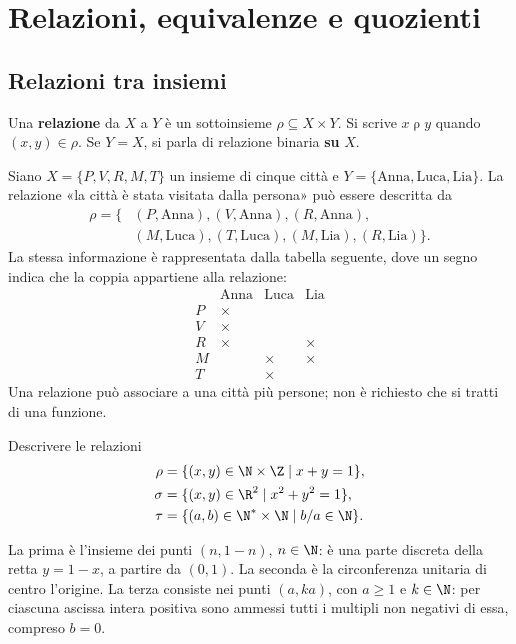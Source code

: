 \chapter{Relazioni, equivalenze e quozienti}

\section{Relazioni tra insiemi}
\begin{definizione}
Una \textbf{relazione} da $X$ a $Y$ è un sottoinsieme $\rho\subseteq X\times Y$. Si scrive $x\mathrel\rho y$ quando $(x,y)\in\rho$. Se $Y=X$, si parla di relazione binaria \textbf{su} $X$.
\end{definizione}

\begin{esempio}
Siano $X=\{P,V,R,M,T\}$ un insieme di cinque città e $Y=\{\text{Anna},\text{Luca},\text{Lia}\}$. La relazione «la città è stata visitata dalla persona» può essere descritta da
\[
\begin{split}
\rho=\{&(P,\text{Anna}),(V,\text{Anna}),(R,\text{Anna}),\\
       &(M,\text{Luca}),(T,\text{Luca}),(M,\text{Lia}),(R,\text{Lia})\}.
\end{split}
\]
La stessa informazione è rappresentata dalla tabella seguente, dove un segno indica che la coppia appartiene alla relazione:
\[
\begin{array}{c|ccc}
&\text{Anna}&\text{Luca}&\text{Lia}\\\hline
P&\times&&\\V&\times&&\\R&\times&&\times\\M&&\times&\times\\T&&\times&
\end{array}
\]
Una relazione può associare a una città più persone; non è richiesto che si tratti di una funzione.
\end{esempio}

\begin{esercizio}
Descrivere le relazioni
\[
\begin{aligned}
\rho&=\{(x,y)\in\N\times\Z\mid x+y=1\},\\
\sigma&=\{(x,y)\in\R^2\mid x^2+y^2=1\},\\
\tau&=\{(a,b)\in\N^*\times\N\mid b/a\in\N\}.
\end{aligned}
\]
\end{esercizio}
\begin{svolgimento}
La prima è l'insieme dei punti $(n,1-n)$, $n\in\N$: è una parte discreta della retta $y=1-x$, a partire da $(0,1)$. La seconda è la circonferenza unitaria di centro l'origine. La terza consiste nei punti $(a,ka)$, con $a\ge1$ e $k\in\N$: per ciascuna ascissa intera positiva sono ammessi tutti i multipli non negativi di essa, compreso $b=0$.
\end{svolgimento}

